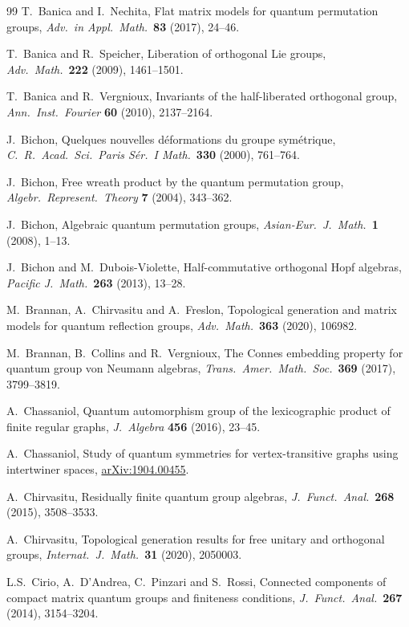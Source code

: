\documentclass[11pt]{amsart}
\theoremstyle{definition}
\theoremstyle{remark}
\theoremstyle{plain}
\numberwithin{equation}{section}
\numberwithin{table}{section}
\begin{document}
\begin{thebibliography}{99}
 T.~Banica and I.~Nechita, Flat matrix models for quantum permutation groups, \emph{Adv.\ in Appl.\ Math.}\ \textbf{83} (2017), 24--46.

 T.~Banica and R.~Speicher, Liberation of orthogonal Lie groups, \emph{Adv.\ Math.}\ \textbf{222} (2009), 1461--1501.

 T.~Banica and R.~Vergnioux, Invariants of the half-liberated orthogonal group, \emph{Ann.\ Inst.\ Fourier} \textbf{60} (2010), 2137--2164.

 J.~Bichon, Quelques nouvelles d\'eformations du groupe sym\'etrique, \emph{C.\ R.\ Acad.\ Sci.\ Paris S\'er.\ I Math.}\ \textbf{330} (2000), 761--764.

 J.~Bichon, Free wreath product by the quantum permutation group, \emph{Algebr.\ Represent.\ Theory} \textbf{7} (2004), 343--362.

 J.~Bichon, Algebraic quantum permutation groups, \emph{Asian-Eur.\ J.\ Math.}\ \textbf{1} (2008), 1--13.

 J.~Bichon and M.~Dubois-Violette, Half-commutative orthogonal Hopf algebras, \emph{Pacific J.\ Math.}\ \textbf{263} (2013), 13--28.

 M.~Brannan, A.~Chirvasitu and A.~Freslon, Topological generation and matrix models for quantum reflection groups, \emph{Adv.\ Math.}\ \textbf{363} (2020), 106982.

 M.~Brannan, B.~Collins and R.~Vergnioux, The Connes embedding property for quantum group von Neumann algebras, \emph{Trans.\ Amer.\ Math.\ Soc.}\ \textbf{369} (2017), 3799--3819.

 A.~Chassaniol, Quantum automorphism group of the lexicographic product of finite regular graphs, \emph{J.\ Algebra} \textbf{456} (2016), 23--45.

 A.~Chassaniol, Study of quantum symmetries for vertex-transitive graphs using intertwiner spaces, \href{https://arxiv.org/pdf/1904.00455}{arXiv:1904.00455}.

 A.~Chirvasitu, Residually finite quantum group algebras, \emph{J.\ Funct.\ Anal.}\ \textbf{268} (2015), 3508--3533.

 A.~Chirvasitu, Topological generation results for free unitary and orthogonal groups, \emph{Internat.\ J.\ Math.}\ \textbf{31} (2020), 2050003.

 L.S.~Cirio, A.~D'Andrea, C.~Pinzari and S.~Rossi, Connected components of compact matrix quantum groups and finiteness conditions, \emph{J.\ Funct.\ Anal.}\ \textbf{267} (2014), 3154--3204.


\end{thebibliography}
\end{document}
